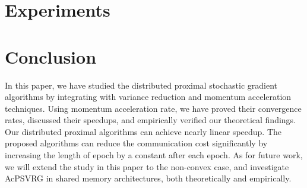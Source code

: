 \documentclass[letterpaper]{article} %
\begin{document}
\section{Experiments}
%


\section{Conclusion}
In this paper, we have studied the distributed proximal stochastic gradient algorithms by integrating with variance reduction and momentum acceleration techniques. Using momentum acceleration rate, we have proved their convergence rates, discussed their speedups, and empirically verified our theoretical findings. Our distributed proximal algorithms can achieve nearly linear speedup. The proposed algorithms can reduce the communication cost significantly by increasing the length of epoch by a constant after each epoch. As for future work, we will extend the study in this paper to the non-convex case, and investigate AcPSVRG in shared memory architectures, both theoretically and empirically.


%


\end{document}
